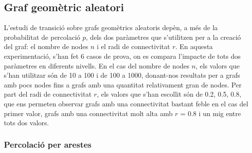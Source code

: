 \documentclass[a4paper]{article}
\begin{document}
	
	
	\subsection{Graf geomètric aleatori}
	
	L'estudi de transició sobre grafs geomètrics aleatoris depèn, a més de la probabilitat de percolació $p$, dels dos paràmetres que s'utilitzen per a la creació del graf: el nombre de nodes $n$ i el radi de connectivitat $r$.
	En aquesta experimentació, s'han fet 6 casos de prova, on es compara l'impacte de tots dos paràmetres en diferents nivells. En el cas del nombre de nodes $n$, els valors que s'han utilitzar són de 10 a 100 i de 100 a 1000,
	donant-nos resultats per a grafs amb pocs nodes fins a grafs amb una quantitat relativament gran de nodes. Per part del radi de connectivitat $r$, els valors que s'han escollit són de 0.2, 0.5, 0.8, que ens permeten observar grafs amb una connectivitat
	bastant feble en el cas del primer valor, grafs amb una connectivitat molt alta amb $r$ = 0.8 i un mig entre tots dos valors.
	
	\subsubsection{Percolació per arestes}
	
\end{document}
